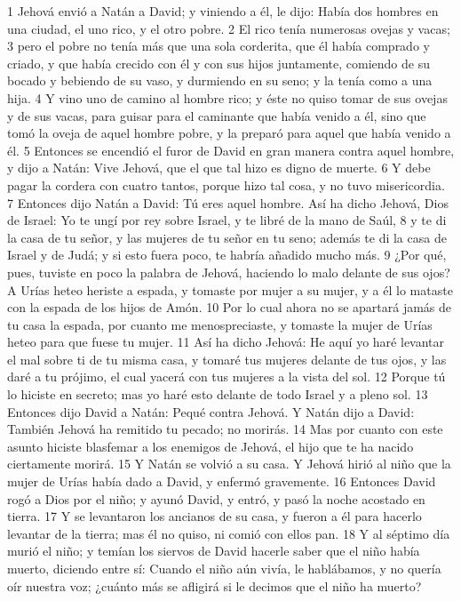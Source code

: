 1 Jehová envió a Natán a David; y viniendo a él, le dijo: Había dos hombres en una ciudad, el uno rico, y el otro pobre.
2 El rico tenía numerosas ovejas y vacas;
3 pero el pobre no tenía más que una sola corderita, que él había comprado y criado, y que había crecido con él y con sus hijos juntamente, comiendo de su bocado y bebiendo de su vaso, y durmiendo en su seno; y la tenía como a una hija.
4 Y vino uno de camino al hombre rico; y éste no quiso tomar de sus ovejas y de sus vacas, para guisar para el caminante que había venido a él, sino que tomó la oveja de aquel hombre pobre, y la preparó para aquel que había venido a él.
5 Entonces se encendió el furor de David en gran manera contra aquel hombre, y dijo a Natán: Vive Jehová, que el que tal hizo es digno de muerte.
6 Y debe pagar la cordera con cuatro tantos, porque hizo tal cosa, y no tuvo misericordia.
7 Entonces dijo Natán a David: Tú eres aquel hombre. Así ha dicho Jehová, Dios de Israel: Yo te ungí por rey sobre Israel, y te libré de la mano de Saúl,
8 y te di la casa de tu señor, y las mujeres de tu señor en tu seno; además te di la casa de Israel y de Judá; y si esto fuera poco, te habría añadido mucho más.
9 ¿Por qué, pues, tuviste en poco la palabra de Jehová, haciendo lo malo delante de sus ojos? A Urías heteo heriste a espada, y tomaste por mujer a su mujer, y a él lo mataste con la espada de los hijos de Amón.
10 Por lo cual ahora no se apartará jamás de tu casa la espada, por cuanto me menospreciaste, y tomaste la mujer de Urías heteo para que fuese tu mujer.
11 Así ha dicho Jehová: He aquí yo haré levantar el mal sobre ti de tu misma casa, y tomaré tus mujeres delante de tus ojos, y las daré a tu prójimo, el cual yacerá con tus mujeres a la vista del sol.
12 Porque tú lo hiciste en secreto; mas yo haré esto delante de todo Israel y a pleno sol. 
13 Entonces dijo David a Natán: Pequé contra Jehová. Y Natán dijo a David: También Jehová ha remitido tu pecado; no morirás.
14 Mas por cuanto con este asunto hiciste blasfemar a los enemigos de Jehová, el hijo que te ha nacido ciertamente morirá.
15 Y Natán se volvió a su casa. Y Jehová hirió al niño que la mujer de Urías había dado a David, y enfermó gravemente.
16 Entonces David rogó a Dios por el niño; y ayunó David, y entró, y pasó la noche acostado en tierra.
17 Y se levantaron los ancianos de su casa, y fueron a él para hacerlo levantar de la tierra; mas él no quiso, ni comió con ellos pan.
18 Y al séptimo día murió el niño; y temían los siervos de David hacerle saber que el niño había muerto, diciendo entre sí: Cuando el niño aún vivía, le hablábamos, y no quería oír nuestra voz; ¿cuánto más se afligirá si le decimos que el niño ha muerto?
